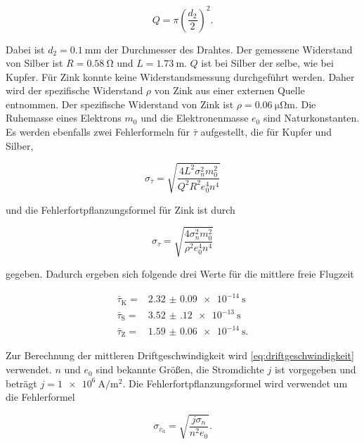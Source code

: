 \begin{equation}
    Q = \pi \left(\frac{d_2}{2}\right)^2.
    \label{eq:Q}
\end{equation}

Dabei ist $d_2 = \SI{0.1}{\milli\meter}$ der Durchmesser des Drahtes.
Der gemessene Widerstand von Silber ist $R = \SI{0.58}{\ohm}$ und $L = \SI{1.73}{\meter}$.
$Q$ ist bei Silber der selbe, wie bei Kupfer.
Für Zink konnte keine Widerstandsmessung durchgeführt werden.
Daher wird der spezifische Widerstand $\rho$ von Zink aus einer externen Quelle entnommen.
Der spezifische Widerstand von Zink ist $\rho = \SI{0.06}{\micro\ohm\meter}$.\cite{zink}
Die Ruhemasse eines Elektrons $m_0$ und die Elektronenmasse $e_0$ sind Naturkonstanten.\cite{physics_constants}
Es werden ebenfalls zwei Fehlerformeln für $\bar{\tau}$ aufgestellt, die für Kupfer und Silber, 

\begin{equation}
    \sigma _{\bar{\tau}} = \sqrt{\frac{4 L^{2} \sigma_{n}^{2} m_{0}^{2}}{Q^{2} R^{2} e_{0}^{4} n^{4}}}
    \label{eq:tau_fehler}
\end{equation}

und die Fehlerfortpflanzungsformel für Zink ist durch

\begin{equation}
    \sigma _{\bar{\tau}} = \sqrt{\frac{4 \sigma_{n}^{2} m_{0}^{2}}{{\rho}^{2} e_{0}^{4} n^{4}}}
    \label{eq:tau_fehler2}
\end{equation}

gegeben. 
Dadurch ergeben sich folgende drei Werte für die mittlere freie Flugzeit

\begin{align}
    \bar{\tau}_\text{K} =& \SI{2.32(9)e-14}{\second} \\
    \bar{\tau}_\text{S} =& \SI{3.52(12)e-13}{\second} \\
    \bar{\tau}_\text{Z} =& \SI{1.59(6)e-14}{\second}.
    \label{eq:tau1}
\end{align}

Zur Berechnung der mittleren Driftgeschwindigkeit wird \autoref{eq:driftgeschwindigkeit} verwendet.
$n$ und $e_0$ sind bekannte Größen, die Stromdichte $j$ ist vorgegeben und beträgt $j = \SI{1e6}{\ampere\per\meter\squared}$.
Die Fehlerfortpflanzungsformel wird verwendet um die Fehlerformel

\begin{equation}
    \sigma _{\bar{v}_\text{d}} = \sqrt{\frac{j \sigma _n}{n^2 e_0}}.
    \label{eq:vd_fehler}
\end{equation}

